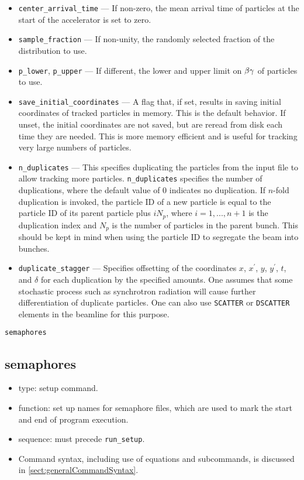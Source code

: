 \documentclass[11pt]{article}
\begin{document}
\begin{itemize}
\item \verb|center_arrival_time| --- If non-zero, the mean arrival time of particles at the start of the
accelerator is set to zero.
\item \verb|sample_fraction| --- If non-unity, the randomly selected fraction of the distribution to use.
\item \verb|p_lower|, \verb|p_upper| --- If different, the lower and upper limit on ${\rm \beta\gamma}$ of particles to use.
\item \verb|save_initial_coordinates| --- A flag that, if set, results in saving initial coordinates
of tracked particles in memory.  This is the default behavior.  If unset, the initial coordinates
are not saved, but are reread from disk each time they are needed.  This is more memory efficient
and is useful for tracking very large numbers of particles.
\item \verb|n_duplicates| --- This specifies duplicating the particles from the input file to allow tracking more
  particles.   \verb|n_duplicates| specifies the number of duplications, where the default value of 0 indicates no duplication.
  If $n$-fold duplication is invoked, the particle ID of a new particle is equal to the particle ID of its parent particle plus
  $i N_p$, where $i=1,...,n+1$ is the duplication index and $N_p$ is the number of particles in the parent bunch.
  This should be kept in mind when using the particle ID to segregate the beam into bunches.
\item \verb|duplicate_stagger| --- Specifies offsetting of the coordinates $x$, $x^\prime$, $y$, $y^\prime$, $t$, and $\delta$
  for each duplication by the specified amounts.
  One assumes that some stochastic process such as synchrotron radiation will cause further differentiation of duplicate particles.
  One can also use \verb|SCATTER| or \verb|DSCATTER| elements in the beamline for this purpose.
\end{itemize}

\newpage
\begin{center}{\Large\verb|semaphores|}\end{center}
\subsection{semaphores \label{subsec:semaphores}}

\begin{itemize}
\item type: setup command.
\item function: set up names for semaphore files, which are used to mark the
        start and end of program execution.
\item sequence: must precede \verb|run_setup|.
\item Command syntax, including use of equations and subcommands, is discussed in \ref{sect:generalCommandSyntax}.
\end{itemize}
\end{document}
